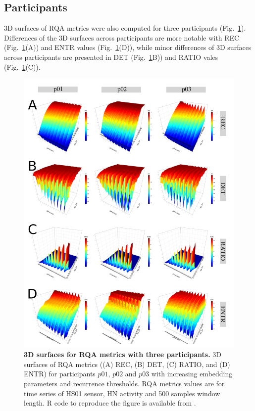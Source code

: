 \subsection{Participants}
3D surfaces of RQA metrics were also computed for three participants 
(Fig.~\ref{fig:topo_participants}).
Differences of the 3D surfaces across participants are more notable with 
REC (Fig.~\ref{fig:topo_participants}(A)) and 
ENTR values (Fig.~\ref{fig:topo_participants}(D)),
while minor differences of 3D surfaces across participants are 
presented in
DET (Fig.~\ref{fig:topo_participants}B)) and 
RATIO vales (Fig.~\ref{fig:topo_participants}(C)).
\begin{figure}[!ht]
\centering
\includegraphics[width=1.0\textwidth]{p}
    \caption{
	{\bf 3D surfaces for RQA metrics with three participants.}
	3D surfaces of RQA metrics ((A) REC, (B) DET, (C) RATIO, and (D) ENTR) 
	for participants $p01$, $p02$ and $p03$ with increasing embedding 
	parameters and recurrence thresholds.
	RQA metrics values are for time series of HS01 sensor, 
	HN activity and 500 samples window length.
	R code to reproduce the figure is available from \cite{hwum2018}.
 }
\label{fig:topo_participants}
\end{figure}



